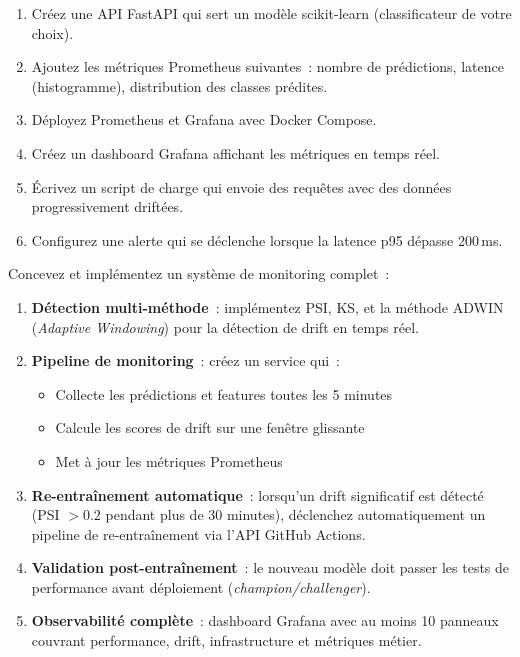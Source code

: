 \begin{exercice}
\begin{enumerate}
    \item Cr\'eez une API FastAPI qui sert un mod\`ele scikit-learn (classificateur de votre choix).
    \item Ajoutez les m\'etriques Prometheus suivantes~: nombre de pr\'edictions, latence (histogramme), distribution des classes pr\'edites.
    \item D\'eployez Prometheus et Grafana avec Docker Compose.
    \item Cr\'eez un dashboard Grafana affichant les m\'etriques en temps r\'eel.
    \item \'Ecrivez un script de charge qui envoie des requ\^etes avec des donn\'ees progressivement drift\'ees.
    \item Configurez une alerte qui se d\'eclenche lorsque la latence p95 d\'epasse 200\,ms.
\end{enumerate}
\end{exercice}

\begin{exercice}
Concevez et impl\'ementez un syst\`eme de monitoring complet~:
\begin{enumerate}
    \item \textbf{D\'etection multi-m\'ethode}~: impl\'ementez PSI, KS, et la m\'ethode ADWIN (\emph{Adaptive Windowing}) pour la d\'etection de drift en temps r\'eel.
    \item \textbf{Pipeline de monitoring}~: cr\'eez un service qui~:
    \begin{itemize}
        \item Collecte les pr\'edictions et features toutes les 5 minutes
        \item Calcule les scores de drift sur une fen\^etre glissante
        \item Met \`a jour les m\'etriques Prometheus
    \end{itemize}
    \item \textbf{Re-entra\^inement automatique}~: lorsqu'un drift significatif est d\'etect\'e (PSI $> 0.2$ pendant plus de 30 minutes), d\'eclenchez automatiquement un pipeline de re-entra\^inement via l'API GitHub Actions.
    \item \textbf{Validation post-entra\^inement}~: le nouveau mod\`ele doit passer les tests de performance avant d\'eploiement (\emph{champion/challenger}).
    \item \textbf{Observabilit\'e compl\`ete}~: dashboard Grafana avec au moins 10 panneaux couvrant performance, drift, infrastructure et m\'etriques m\'etier.
\end{enumerate}
\end{exercice}

